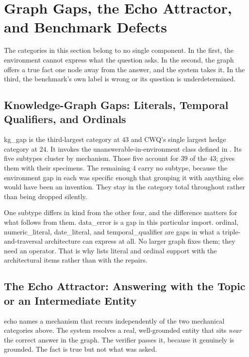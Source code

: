 \section{Graph Gaps, the Echo Attractor, and Benchmark
Defects}\label{sec:failures-outside}

The categories in this section belong to no single component. In the first, the
environment cannot express what the question asks. In the second, the graph
offers a true fact one node away from the answer, and the system takes it. In
the third, the benchmark's own label is wrong or its question is
underdetermined.

\subsection{Knowledge-Graph Gaps: Literals, Temporal Qualifiers, and
Ordinals}\label{sec:kg-gaps}

\textsf{kg\_gap} is the third-largest category at $43$ and CWQ's single largest
hedge category at $24$. It invokes the unanswerable-in-environment class defined
in . Its five subtypes cluster by mechanism. Those five
account for $39$ of the $43$;  gives them with their
specimens. The remaining $4$ carry no subtype, because the environment gap in
each was specific enough that grouping it with anything else would have been an
invention. They stay in the category total throughout rather than being dropped
silently.

One subtype differs in kind from the other four, and the difference matters for
what follows from them. \textsf{data\_error} is a gap in this particular import.
\textsf{ordinal}, \textsf{numeric\_literal}, \textsf{date\_literal}, and
\textsf{temporal\_qualifier} are gaps in what a triple-and-traversal
architecture can express at all. No larger graph fixes them; they need an
operator. That is why  lists literal and ordinal support with
the architectural items rather than with the repairs.

\subsection{The Echo Attractor: Answering with the Topic or an Intermediate
Entity}\label{sec:echo}

\textsf{echo} names a mechanism that recurs independently of the two mechanical
categories above. The system resolves a real, well-grounded entity that
sits \emph{near} the correct answer in the graph. The
verifier passes it, because it genuinely is grounded. The fact is true but not
what was asked.

